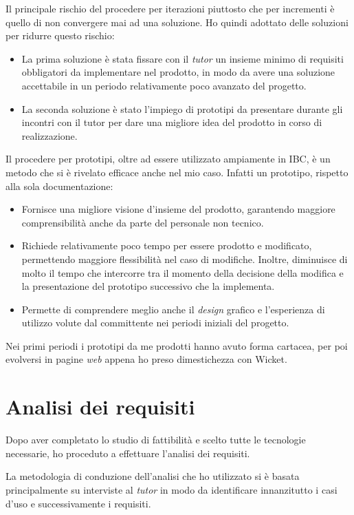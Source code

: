 	Il principale rischio del procedere per iterazioni piuttosto che per \gls{incrementi} è quello di non convergere mai ad una soluzione. Ho quindi adottato delle soluzioni per ridurre questo rischio: 
	\begin{itemize}
		\item La prima soluzione è stata fissare con il \textit{tutor} un insieme minimo di requisiti obbligatori da implementare nel prodotto, in modo da avere una soluzione accettabile in un periodo relativamente poco avanzato del progetto.
		\item La seconda soluzione è stato l'impiego di prototipi da presentare durante gli incontri con il tutor per dare una migliore idea del prodotto in corso di realizzazione.
	\end{itemize}

	Il procedere per prototipi, oltre ad essere utilizzato ampiamente in IBC, è un metodo che si è rivelato efficace anche nel mio caso. Infatti un prototipo, rispetto alla sola documentazione: 
	\begin{itemize}
		\item Fornisce una migliore visione d'insieme del prodotto, garantendo maggiore comprensibilità anche da parte del personale non tecnico.
		\item Richiede relativamente poco tempo per essere prodotto e modificato, permettendo maggiore flessibilità nel caso di modifiche. Inoltre, diminuisce di molto il tempo che intercorre tra il momento della decisione della modifica e la presentazione del prototipo successivo che la implementa.
		\item Permette di comprendere meglio anche il \textit{design} grafico e l'esperienza di utilizzo volute dal committente nei periodi iniziali del progetto.
	\end{itemize}
	Nei primi periodi i prototipi da me prodotti hanno avuto forma cartacea, per poi evolversi in pagine \textit{web} appena ho preso dimestichezza con Wicket.
	
\section{Analisi dei requisiti}
	Dopo aver completato lo studio di fattibilità e scelto tutte le tecnologie necessarie, ho proceduto a effettuare l'analisi dei requisiti.
	
	La metodologia di conduzione dell'analisi che ho utilizzato si è basata principalmente su interviste al \textit{tutor} in modo da identificare innanzitutto i casi d'uso e successivamente i requisiti.
	
